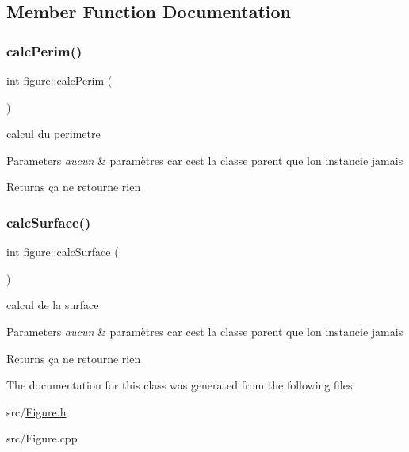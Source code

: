 \subsection{Member Function Documentation}
\mbox{\label{classfigure_afc1d57fa737d39192a0c00125c4cda19}} 
\subsubsection{\texorpdfstring{calc\+Perim()}{calcPerim()}}
{\footnotesize\ttfamily int figure\+::calc\+Perim (\begin{DoxyParamCaption}{ }\end{DoxyParamCaption})\hspace{0.3cm}{\ttfamily [virtual]}}



calcul du perimetre 


\begin{DoxyParams}{Parameters}
{\em aucun} & paramètres car c\textquotesingle{}est la classe parent que l\textquotesingle{}on instancie jamais \\
\hline
\end{DoxyParams}
\begin{DoxyReturn}{Returns}
ça ne retourne rien 
\end{DoxyReturn}
\mbox{\label{classfigure_a168accd9182dbbef2a580c5e1c34d12e}} 
\subsubsection{\texorpdfstring{calc\+Surface()}{calcSurface()}}
{\footnotesize\ttfamily int figure\+::calc\+Surface (\begin{DoxyParamCaption}{ }\end{DoxyParamCaption})\hspace{0.3cm}{\ttfamily [virtual]}}



calcul de la surface 


\begin{DoxyParams}{Parameters}
{\em aucun} & paramètres car c\textquotesingle{}est la classe parent que l\textquotesingle{}on instancie jamais \\
\hline
\end{DoxyParams}
\begin{DoxyReturn}{Returns}
ça ne retourne rien 
\end{DoxyReturn}


The documentation for this class was generated from the following files\+:\begin{DoxyCompactItemize}
\item 
src/\hyperlink{_figure_8h}{Figure.\+h}\item 
src/Figure.\+cpp\end{DoxyCompactItemize}

